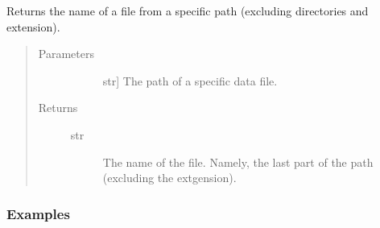 \documentclass[letterpaper,10pt,english]{sphinxmanual}
\begin{document}
\begin{fulllineitems}
\label{\detokenize{index:gps2net.getFilename}}
Returns the name of a file from a specific path (excluding directories and extension).
\begin{quote}\begin{description}
\item[{Parameters}] \leavevmode\begin{description}
\item[{}] \leavevmode{[}str{]}
The path of a specific data file.

\end{description}

\item[{Returns}] \leavevmode\begin{description}
\item[{str}] \leavevmode
The name of the file. Namely, the last part of the path (excluding the extgension).

\end{description}

\end{description}\end{quote}
\subsubsection*{Examples}

\begin{sphinxVerbatim}[commandchars=\\\{\}]
  
  
\end{sphinxVerbatim}

\end{fulllineitems}

\end{document}
